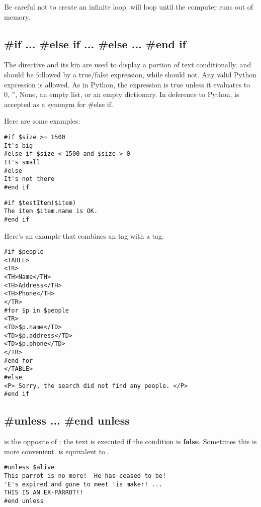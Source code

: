 Be careful not to create an infinite loop.   will loop until
the computer runs out of memory.

\subsection{\#if ... \#else if ... \#else ... \#end if}
\label{flowControl.if}

The  directive and its kin are used to display a portion of text
conditionally.  and  should be followed by a
true/false expression, while  should not.  Any valid Python 
expression is allowed.  As in Python, the expression is true unless it evaluates
to 0, '', None, an empty list, or an empty dictionary.  In deference to Python,
 is accepted as a synonym for {\#else if}.

Here are some examples:
\begin{verbatim}
#if $size >= 1500
It's big
#else if $size < 1500 and $size > 0 
It's small
#else
It's not there
#end if
\end{verbatim}

\begin{verbatim}
#if $testItem($item)
The item $item.name is OK.
#end if
\end{verbatim}

Here's an example that combines an  tag with a  tag.
\begin{verbatim}
#if $people
<TABLE>
<TR>
<TH>Name</TH>
<TH>Address</TH>
<TH>Phone</TH>
</TR>
#for $p in $people
<TR>
<TD>$p.name</TD>
<TD>$p.address</TD>
<TD>$p.phone</TD>
</TR>
#end for
</TABLE>
#else
<P> Sorry, the search did not find any people. </P>
#end if
\end{verbatim}


\subsection{\#unless ... \#end unless}
\label{flowControl.unless}

 is the opposite of : the text is executed if the
condition is {\bf false}.  Sometimes this is more convenient.
 is equivalent to .

\begin{verbatim}
#unless $alive
This parrot is no more!  He has ceased to be!
'E's expired and gone to meet 'is maker! ...
THIS IS AN EX-PARROT!!
#end unless
\end{verbatim}

